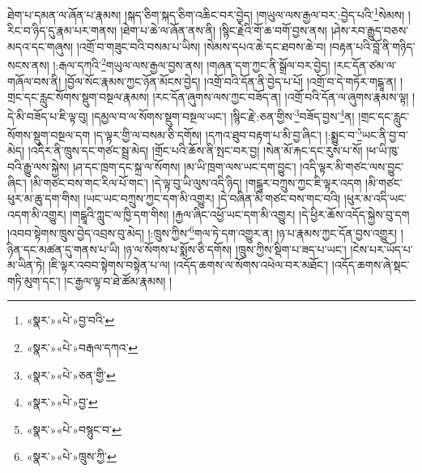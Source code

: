 ཐེག་པ་དམན་ལ་ཞོན་པ་རྣམས། །སྐད་ཅིག་སྐད་ཅིག་འཆིང་བར་བྱེད། །གཡུལ་ལས་རྒྱལ་བར་:བྱེད་པའི་\footnote{«སྣར་»«པེ་»བྱ་བའི་}སེམས། །རིང་བ་ཉིད་དུ་རྣམ་པར་གནས། །ཐེག་པ་ཆེ་ལ་ཞོན་ནས་ནི། །སྙིང་རྗེའི་གོ་ཆ་བགོ་བྱས་ནས། །ཤེས་རབ་རྒྱུད་བཅས་མདའ་དང་གཞུས། །འགྲོ་བ་གཟུང་བའི་བསམ་པ་ཡིས། །སེམས་དཔའ་ཆེ་དང་ཐབས་ཆེ་བ། །བརྟན་པའི་བློ་ནི་གཉིད་སངས་ནས། །:རྒལ་དཀའི་\footnote{«སྣར་»«པེ་»བརྒལ་དཀའ་}གཡུལ་ལས་རྒྱལ་བྱས་ནས། །གཞན་དག་ཀྱང་ནི་སྒྲོལ་བར་བྱེད། །རང་དོན་ཙམ་ལ་གཞོལ་བས་ནི། །བྱོལ་སོང་རྣམས་ཀྱང་ཉོན་མོངས་བྱེད། །འགྲོ་བའི་དོན་ནི་བྱེད་པ་པོ། །འགྲོ་བ་དེ་གཏོར་གངྒཱ་ན། །གྲང་དང་རླུང་སོགས་སྡུག་བསྔལ་རྣམས། །རང་དོན་ཞུགས་ལས་ཀྱང་བཟོད་ན། །འགྲོ་བའི་དོན་ལ་ཞུགས་རྣམས་ལྟ། །དེ་མི་བཟོད་པ་ཇི་ལྟ་བུ། །དམྱལ་བ་ལ་སོགས་སྡུག་བསྔལ་ཡང་། །སྙིང་རྗེ་:ཅན་གྱིས་\footnote{«སྣར་»«པེ་»ཅན་གྱི་}བཟོད་བྱས་\footnote{«སྣར་»«པེ་»བྱ་}ན། །གྲང་དང་རླུང་སོགས་སྡུག་བསྔལ་དག །ད་ལྟར་གྱི་ལ་བསམ་ཅི་དགོས། །དཀའ་ཐུབ་བརྟག་པ་མི་བྱ་ཞིང་། །:སྨྱུང་བ་\footnote{«སྣར་»«པེ་»བསྙུང་བ་}ཡང་ནི་བྱ་བ་མེད། །འདིར་ནི་ཁྲུས་དང་གཙང་སྦྲ་མེད། །གྲོང་པའི་ཆོས་ནི་སྤང་བར་བྱ། །སེན་མོ་རྐང་དང་རུས་པ་སོ། །ཕ་ཡི་ཁུ་བའི་རྒྱུ་ལས་སྐྱེས། །ཤ་དང་ཁྲག་དང་སྐྲ་ལ་སོགས། །མ་ཡི་ཁྲག་ལས་ཡང་དག་བྱུང་། །འདི་ལྟར་མི་གཙང་ལས་བྱུང་ཞིང་། །མི་གཙང་བས་གང་རིལ་པོ་གང་། །དེ་ལྟ་བུ་ཡི་ལུས་འདི་ཉིད། །གངྒཱར་བཀྲུས་ཀྱང་ཇི་ལྟར་འདག །མི་གཙང་ཕུར་མ་ཆུ་དག་གིས། །ཡང་ཡང་བཀྲུས་ཀྱང་དག་མི་འགྱུར། །དེ་བཞིན་མི་གཙང་བས་གང་བའི། །ཕུར་མ་འདི་ཡང་འདག་མི་འགྱུར། །གངྒཱའི་ཀླུང་ལ་ཁྱི་དག་གིས། །རྐྱལ་ཞིང་འཕྱོ་ཡང་དག་མི་འགྱུར། །དེ་ཕྱིར་ཆོས་འདོད་སྐྱེས་བུ་དག །འབབ་སྟེགས་ཁྲུས་བྱེད་འབྲས་བུ་མེད། །:ཁྲུས་ཀྱིས་\footnote{«སྣར་»«པེ་»ཁྲུས་ཀྱི་}གལ་ཏེ་དག་འགྱུར་ན། །ཉ་པ་རྣམས་ཀྱང་དོན་བྱས་འགྱུར། །ཉིན་དང་མཚན་དུ་གནས་པ་ཡི། །ཉ་ལ་སོགས་པ་སྨོས་ཅི་དགོས། །ཁྲུས་ཀྱིས་སྡིག་པ་ཟད་པ་ཡང་། །ངེས་པར་ཡོད་པ་མ་ཡིན་ཏེ། །ཇི་ལྟར་འབབ་སྟེགས་བསྟེན་པ་ལ། །འདོད་ཆགས་ལ་སོགས་འཕེལ་བར་མཐོང་། །འདོད་ཆགས་ཞེ་སྡང་གཏི་མུག་དང་། །ང་རྒྱལ་ལྟ་བ་ཐེ་ཚོམ་རྣམས། །
